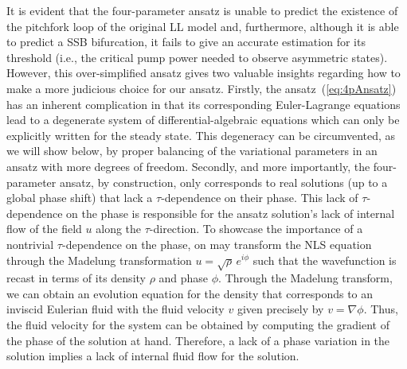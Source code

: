 It is evident that the four-parameter ansatz is unable to predict the
existence of the pitchfork loop of the original LL model and, furthermore,
although it is able to predict a SSB bifurcation, it fails to give an 
accurate estimation for its threshold (i.e., the critical
pump power needed to observe asymmetric states).
%
However, this over-simplified ansatz gives two valuable insights regarding 
how to make a more judicious choice for our ansatz. 
%
Firstly, the ansatz~(\ref{eq:4pAnsatz}) has an inherent complication in that
its corresponding Euler-Lagrange equations lead to a degenerate system
of differential-algebraic equations which can only be explicitly written
for the steady state. 
%
This degeneracy can be circumvented, as we will show below, by proper balancing 
of the variational parameters in an ansatz with more degrees of freedom.
%
Secondly, and more importantly, the four-parameter ansatz, by construction, 
only corresponds to real solutions (up to a global phase shift) that lack a 
$\tau$-dependence on their phase.
%
This lack of $\tau$-dependence on the phase is responsible for the
ansatz solution's lack of internal flow of the field $u$
along the $\tau$-direction.  To showcase the importance of a nontrivial $\tau$-dependence on the phase, on may transform the NLS equation through the Madelung transformation $u=\sqrt{\rho}\,e^{i\phi}$ such that the wavefunction is recast in terms of its density $\rho$ and phase $\phi$.  Through the Madelung transform, we can obtain an evolution equation for the density that corresponds to an inviscid Eulerian fluid with the fluid velocity $v$ given precisely by $v = \nabla \phi$.  Thus, the fluid velocity for the system can be obtained by computing
the gradient of the phase of the solution at hand.
Therefore, a lack of a phase variation in the solution
implies a lack of internal fluid flow for the solution. 
%
